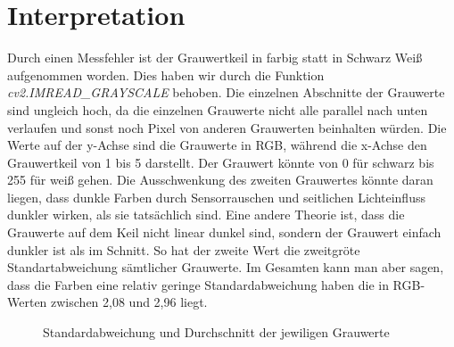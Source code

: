 \documentclass[12pt, oneside, a4paper, \docLanguage]{report}
\begin{document}
\newpage
\section{Interpretation}
\label{chap:VERSUCH_1_INTERPRETATION}
Durch einen Messfehler ist der Grauwertkeil in farbig statt in Schwarz Weiß aufgenommen worden. 
Dies haben wir durch die Funktion \textit{cv2.IMREAD\_GRAYSCALE} behoben. Die einzelnen Abschnitte der Grauwerte sind ungleich hoch, da die einzelnen Grauwerte nicht alle parallel nach unten verlaufen und sonst noch Pixel von anderen Grauwerten beinhalten würden.
\newline
Die Werte auf der y-Achse sind die Grauwerte in RGB, während die x-Achse den Grauwertkeil von 1 bis 5 darstellt.
Der Grauwert könnte von 0 für schwarz bis 255 für weiß gehen.
\newline
Die Ausschwenkung des zweiten Grauwertes könnte daran liegen, dass dunkle Farben durch Sensorrauschen und seitlichen Lichteinfluss dunkler wirken, als sie tatsächlich sind.
Eine andere Theorie ist, dass die Grauwerte auf dem Keil nicht linear dunkel sind, sondern der Grauwert einfach dunkler ist als im Schnitt.
So hat der zweite Wert die zweitgröte Standartabweichung sämtlicher Grauwerte.
\newline
Im Gesamten kann man aber sagen, dass die Farben eine relativ geringe Standardabweichung haben die in RGB-Werten zwischen 2,08 und 2,96 liegt.
\begin{figure}[hbt!]
  	\centering
	\hfill
	\caption{Standardabweichung und Durchschnitt der jewiligen Grauwerte}
\end{figure}
\end{document}
